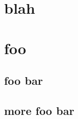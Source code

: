 \documentclass{scrreprt}
\begin{document}
\chapter{blah}
\lipsum
\clearpage
\lipsum
\clearpage
\chapter{foo}
\section{foo bar}

\section{more foo bar}

%
%
%
%
\end{document}
